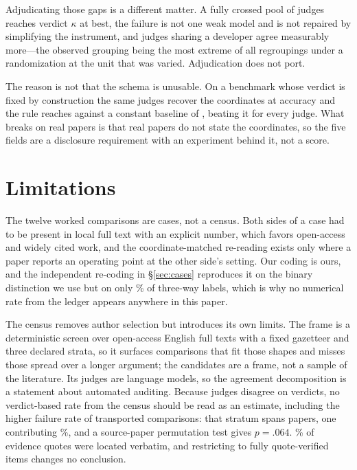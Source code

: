 \documentclass[11pt]{article}
\begin{document}
Adjudicating those gaps is a different matter. A fully crossed pool of
\TierPanelN{} judges reaches verdict $\kappa$ \TierFrontierVerdictK{} at best,
the failure is not one weak model and is not repaired by simplifying the
instrument, and judges sharing a developer agree measurably more---the observed
grouping being the most extreme of all \TierDevRand{} regroupings under a
randomization at the unit that was varied. Adjudication does not port.

The reason is not that the schema is unusable. On a benchmark whose verdict is
fixed by construction the same judges recover the coordinates at
\InsCoordFull{} accuracy and the rule reaches \InsRule{} against a constant
baseline of \InsBaseline{}, beating it for every judge. What breaks on real
papers is that real papers do not state the coordinates, so the five fields are
a disclosure requirement with an experiment behind it, not a score.

\section*{Limitations}

The twelve worked comparisons are cases, not a census. Both sides of a case had
to be present in local full text with an explicit number, which favors
open-access and widely cited work, and the coordinate-matched re-reading exists
only where a paper reports an operating point at the other side's setting. Our
coding is ours, and the independent re-coding in \S\ref{sec:cases} reproduces it
on the binary distinction we use but on only \RecThreeWayPct\% of three-way
labels, which is why no numerical rate from the ledger appears anywhere in this
paper.

The census removes author selection but introduces its own limits. The frame is
a deterministic screen over open-access English full texts with a fixed
gazetteer and three declared strata, so it surfaces comparisons that fit those
shapes and misses those spread over a longer argument; the \FrameCandidates{}
candidates are a frame, not a sample of the literature. Its judges are language
models, so the agreement decomposition is a statement about automated auditing.
Because judges disagree on verdicts, no verdict-based rate from the census
should be read as an estimate, including the higher failure rate of transported
comparisons: that stratum spans \ProvTransPapers{} papers, one contributing
\ProvTransLargest\%, and a source-paper permutation test gives $p=.064$.
\CensusQuoteRate\% of evidence quotes were located verbatim, and restricting to
fully quote-verified items changes no conclusion.
\end{document}
